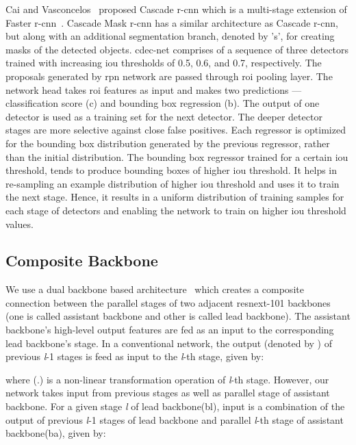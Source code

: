 \documentclass[a4paper,conference]{IEEEtran}
\begin{document}
Cai and Vasconcelos~\cite{cai2019cascade} proposed Cascade {\sc r-cnn} which is a multi-stage extension of Faster {\sc r-cnn}~\cite{ren2015faster}. Cascade Mask {\sc r-cnn} has a similar architecture as Cascade {\sc r-cnn}, but along with an additional segmentation branch, denoted by '{\sc s}', for creating masks of the detected objects. {\sc cd}e{\sc c-n}et comprises of a sequence of three detectors trained with increasing {\sc i}o{\sc u} thresholds of 0.5, 0.6, and 0.7, respectively. The proposals generated by {\sc rpn} network are passed through {\sc roi} pooling layer. The network head takes {\sc roi} features as input and makes two predictions --- classification score ({\sc c}) and bounding box regression ({\sc b}). The output of one detector is used as a training set for the next detector. The deeper detector stages are more selective against close false positives. Each regressor is optimized for the bounding box distribution generated by the previous regressor, rather than the initial distribution. The bounding box regressor trained for a certain {\sc i}o{\sc u} threshold, tends to produce bounding boxes of higher {\sc i}o{\sc u} threshold. It helps in re-sampling an example distribution of higher {\sc i}o{\sc u} threshold and uses it to train the next stage. Hence, it results in a uniform distribution of training samples for each stage of detectors and enabling the network to train on higher {\sc i}o{\sc u} threshold values. 

\subsection{Composite Backbone}

We use a dual backbone based architecture~\cite{liu2019cbnet} which creates a composite connection between the parallel stages of two adjacent {\sc r}es{\sc n}e{\sc x}t-101 backbones (one is called assistant backbone and other is called lead backbone). The assistant backbone's high-level output features are fed as an input to the corresponding lead backbone's stage.
In a conventional network, the output (denoted by ) of previous \emph{l}-1 stages  is feed as input to the \emph{l}-th stage, given by:

where (.) is a non-linear transformation operation of \emph{l}-th stage.
However, our network takes input from previous stages as well as parallel stage of assistant backbone. For a given stage \emph{l} of lead backbone(bl), input is a combination of the output of previous \emph{l}-1 stages of lead backbone and parallel \emph{l}-th stage of assistant backbone(ba), given by:
\end{document}

